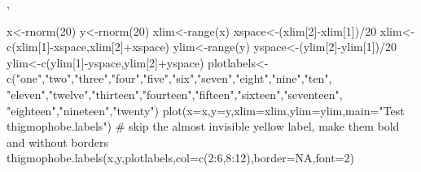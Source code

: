 \begin{SeeAlso}\relax
{}, 
\end{SeeAlso}
\begin{Examples}
\begin{ExampleCode}
 x<-rnorm(20)
 y<-rnorm(20)
 xlim<-range(x)
 xspace<-(xlim[2]-xlim[1])/20
 xlim<-c(xlim[1]-xspace,xlim[2]+xspace)
 ylim<-range(y)
 yspace<-(ylim[2]-ylim[1])/20
 ylim<-c(ylim[1]-yspace,ylim[2]+yspace)
 plotlabels<-
  c("one","two","three","four","five","six","seven","eight","nine","ten",
  "eleven","twelve","thirteen","fourteen","fifteen","sixteen","seventeen",
  "eighteen","nineteen","twenty")
 plot(x=x,y=y,xlim=xlim,ylim=ylim,main="Test thigmophobe.labels")
 # skip the almost invisible yellow label, make them bold and without borders
 thigmophobe.labels(x,y,plotlabels,col=c(2:6,8:12),border=NA,font=2)
\end{ExampleCode}
\end{Examples}

